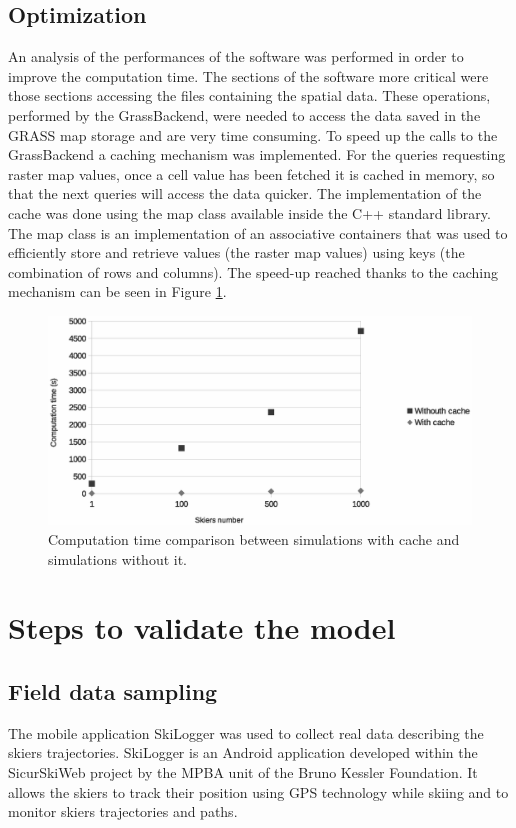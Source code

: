 \documentclass[12pt,a4paper,twoside]{book}
\begin{document}
\section{Optimization}
An analysis of the performances of the software was performed in order to improve the computation time. The sections of the software more critical were those sections accessing the files containing the spatial data. These operations, performed by the GrassBackend, were needed to access the data saved in the GRASS map storage and are very time consuming. To speed up the calls to the GrassBackend a caching mechanism was implemented. For the queries requesting raster map values, once a cell value has been fetched it is cached in memory, so that the next queries will access the data quicker. The implementation of the cache was done using the map class available inside the C++ standard library. The map class is an implementation of an associative containers that was used to efficiently store and retrieve values (the raster map values) using keys (the combination of rows and columns). The speed-up reached thanks to the caching mechanism can be seen in Figure \ref{speed-up_cache}.

\begin{figure}[!h]
  \begin{center}
    \includegraphics[width=\textwidth]{images/caching.eps}
    \caption{Computation time comparison between simulations with cache and simulations without it.}\label{speed-up_cache}
  \end{center}
\end{figure}

\chapter{Steps to validate the model}\label{steps_validate}
\section{Field data sampling}
The mobile application SkiLogger was used to collect real data describing the skiers trajectories. SkiLogger is an Android application developed within the SicurSkiWeb project by the MPBA unit of the Bruno Kessler Foundation. It allows the skiers to track their position using GPS technology while skiing and to monitor skiers trajectories and paths.
\end{document}
